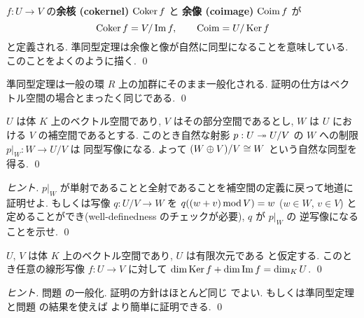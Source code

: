 \documentclass[12pt,twoside]{jarticle}
\begin{document}

\begin{guide}
  $f:U\to V$ の{\bf 余核 (cokernel)} $\mathop{\mathrm{Coker}}\nolimits f$ と
  {\bf 余像 (coimage)} $\mathop{\mathrm{Coim}}\nolimits f$ が
  \begin{equation*}
    \mathop{\mathrm{Coker}}\nolimits f = V/\mathop{\mathrm{Im}}\nolimits f, \qquad \mathop{\mathrm{Coim}}\nolimits = U/\mathop{\mathrm{Ker}}\nolimits f
  \end{equation*}
  と定義される.  準同型定理は余像と像が自然に同型になることを意味している.
  このことをよくのように描く.
  \qed
\end{guide}


\begin{guide}
  準同型定理は一般の環 $R$ 上の加群にそのまま一般化される.
  証明の仕方はベクトル空間の場合とまったく同じである.
  \qed
\end{guide}


\begin{question}
  \label{q:W=Imf}
  $U$ は体 $K$ 上のベクトル空間であり, $V$ はその部分空間であるとし,
  $W$ は $U$ における $V$ の補空間であるとする.
  このとき自然な射影 $p:U\twoheadrightarrow U/V$ の $W$ への制限 $p|_W:W\to U/V$ は
  同型写像になる. よって $(W\oplus V)/V\cong W$ という自然な同型を得る.
  \qed
\end{question}

\begin{proof}[ヒント]
  $p|_W$ が単射であることと全射であることを補空間の定義に戻って地道に
  証明せよ.
  もしくは写像 $q:U/V\to W$ を $q((w+v)\mathop{\mathrm{mod}}\nolimits V) = w$ ($w\in W$, $v\in V$) 
  と定めることができ(well-definedness のチェックが必要), $q$ が $p|_W$ の
  逆写像になることを示せ. \qed
\end{proof}


\begin{question}
  $U$, $V$ は体 $K$ 上のベクトル空間であり, $U$ は有限次元である
  と仮定する. このとき任意の線形写像 $f:U\to V$ に対して %
  $\dim\mathop{\mathrm{Ker}}\nolimits f + \dim\mathop{\mathrm{Im}}\nolimits f = \dim_K U$.
  \qed
\end{question}

\begin{proof}[ヒント]
  問題  の一般化. 証明の方針はほとんど同じ
  でよい. もしくは準同型定理と問題  の結果を使えば
  より簡単に証明できる.
  \qed
\end{proof}
\end{document}
